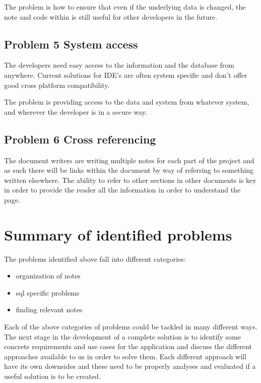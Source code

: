 The problem is how to ensure that even if the underlying data is
changed, the note and code within is still useful for other developers
in the future.

\subsection{Problem 5 System access}\label{problem-5-system-access}

The developers need easy access to the information and the database from
anywhere. Current solutions for IDE's are often system specific and
don't offer good cross platform compatibility.

The problem is providing access to the data and system from whatever
system, and wherever the developer is in a secure way.

\subsection{Problem 6 Cross
referencing}\label{problem-6-cross-referencing}

The document writers are writing multiple notes for each part of the
project and as such there will be links within the document by way of
referring to something written elsewhere. The ability to refer to other
sections in other documents is key in order to provide the reader all
the information in order to understand the page.

\section{Summary of identified
problems}\label{summary-of-identified-problems}

The problems identified above fall into different categories:

\begin{itemize}
\tightlist
\item
  organization of notes
\item
  sql specific problems
\item
  finding relevant notes
\end{itemize}

Each of the above categories of problems could be tackled in many
different ways. The next stage in the development of a complete solution
is to identify some concrete requirements and use cases for the
application and discuss the different approaches available to us in
order to solve them. Each different approach will have its own downsides
and these need to be properly analyses and evaluated if a useful
solution is to be created.
